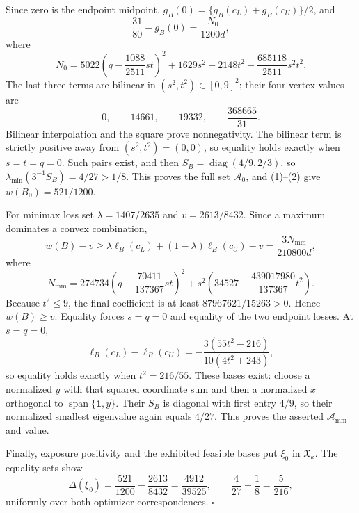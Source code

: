 Since zero is the endpoint midpoint, \(g_B(0)=\{g_B(c_L)+g_B(c_U)\}/2\), and
\[
\frac{31}{80}-g_B(0)=\frac{N_0}{1200d},
\]
where
\[
N_0
=5022\left(q-\frac{1088}{2511}st\right)^2
+1629s^2+2148t^2-\frac{685118}{2511}s^2t^2.
\]
The last three terms are bilinear in \((s^2,t^2)\in[0,9]^2\); their four vertex values are
\[
0,
\qquad
14661,
\qquad
19332,
\qquad
\frac{368665}{31}.
\]
Bilinear interpolation and the square prove nonnegativity.  The bilinear term is strictly positive away from \((s^2,t^2)=(0,0)\), so equality holds exactly when \(s=t=q=0\).  Such pairs exist, and then \(S_B=\operatorname{diag}(4/9,2/3)\), so \(\lambda_{\min}(3^{-1}S_B)=4/27>1/8\).  This proves the full set \(\mathcal A_0\), and (1)--(2) give \(w(B_0)=521/1200\).

For minimax loss set \(\lambda=1407/2635\) and \(v=2613/8432\).  Since a maximum dominates a convex combination,
\[
w(B)-v
\ge\lambda\ell_B(c_L)+(1-\lambda)\ell_B(c_U)-v
=\frac{3N_{\mathrm{mm}}}{210800d},
\]
where
\[
N_{\mathrm{mm}}
=274734\left(q-\frac{70411}{137367}st\right)^2
+s^2\left(34527-\frac{439017980}{137367}t^2\right).
\]
Because \(t^2\le9\), the final coefficient is at least \(87967621/15263>0\).  Hence \(w(B)\ge v\).  Equality forces \(s=q=0\) and equality of the two endpoint losses.  At \(s=q=0\),
\[
\ell_B(c_L)-\ell_B(c_U)
=-\frac{3(55t^2-216)}{10(4t^2+243)},
\]
so equality holds exactly when \(t^2=216/55\).  These bases exist: choose a normalized \(y\) with that squared coordinate sum and then a normalized \(x\) orthogonal to \(\operatorname{span}\{\mathbf1,y\}\).  Their \(S_B\) is diagonal with first entry \(4/9\), so their normalized smallest eigenvalue again equals \(4/27\).  This proves the asserted \(\mathcal A_{\mathrm{mm}}\) and value.

Finally, exposure positivity and the exhibited feasible bases put \(\xi_0\) in \(\mathfrak X_\kappa\).  The equality sets show
\[
\Delta(\xi_0)
=\frac{521}{1200}-\frac{2613}{8432}
=\frac{4912}{39525},
\qquad
\frac4{27}-\frac18=\frac5{216},
\]
uniformly over both optimizer correspondences. \(\square\)